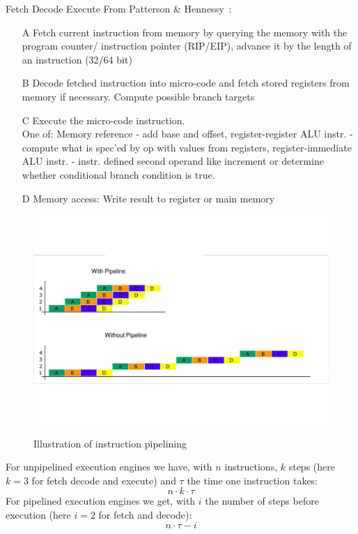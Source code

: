 \documentclass[10pt]{beamer}
\begin{document}
\begin{frame}[allowframebreaks]{Fetch Decode Execute}
From Patterson \& Hennessy~\autocite{hennessy2011computer}:
	\begin{itemize}
	 \item[A] Fetch current instruction from memory by querying the memory with the program counter/ instruction pointer (RIP/EIP), advance it by the length of an instruction (32/64 bit)
	 \item[B] Decode fetched instruction into micro-code and fetch stored registers from memory if necessary. Compute possible branch targets
	 \item[C] Execute the micro-code instruction. \\ One of: Memory reference - add base and offset, register-register ALU instr. - compute what is spec'ed by op with values from registers, register-immediate ALU instr. - instr. defined second operand like increment or determine whether conditional branch condition is true.
	 \item[D] Memory access: Write result to register or main memory
	\end{itemize}

		\begin{figure}
       \begin{center}
        \includegraphics[keepaspectratio, width=\textwidth,height=0.95\textheight-4\baselineskip]{img/Befehlspipeline.pdf} \\
      \end{center}
      \caption{Illustration of instruction pipelining~\autocite{Pipeline}}
      \end{figure} 
      \framebreak
      
      For unpipelined execution engines we have, with $n$ instructions, $k$ steps (here $k = 3$ for fetch decode and execute) and $\tau$ the time one instruction takes:
      \[ n \cdot k \cdot \tau \]
      For pipelined execution engines we get, with $i$ the number of steps before execution (here $i = 2$ for fetch and decode):
      \[ n \cdot \tau - i \]
\end{frame}
\end{document}
